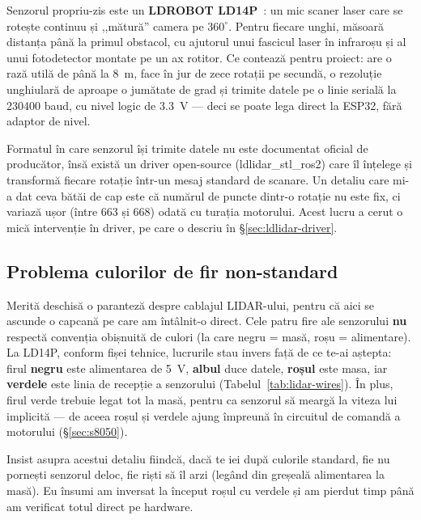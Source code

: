 \documentclass[a4paper,12pt,twoside,openany]{report}
\renewcommand{\texttt}[1]{\textnormal{#1}}
\begin{document}
Senzorul propriu-zis este un \textbf{LDROBOT LD14P}~\cite{ld14p}: un mic
scaner laser care se rotește continuu și ,,mătură'' camera pe $360^\circ$.
Pentru fiecare unghi, măsoară distanța până la primul obstacol, cu ajutorul
unui fascicul laser în infraroșu și al unui fotodetector montate pe un ax
rotitor. Ce contează pentru proiect: are o rază utilă de până la
\SI{8}{\meter}, face în jur de zece rotații pe secundă, o rezoluție unghiulară
de aproape o jumătate de grad și trimite datele pe o linie serială la
\SI{230400}{} baud, cu nivel logic de \SI{3.3}{\volt} — deci se poate lega
direct la ESP32, fără adaptor de nivel.

Formatul în care senzorul își trimite datele nu este documentat oficial de
producător, însă există un driver open-source (\texttt{ldlidar\_stl\_ros2})
care îl înțelege și transformă fiecare rotație într-un mesaj standard de
scanare. Un detaliu care mi-a dat ceva bătăi de cap este că numărul de puncte
dintr-o rotație nu este fix, ci variază ușor (între 663 și 668) odată cu
turația motorului. Acest lucru a cerut o mică intervenție în driver, pe care o
descriu în §\ref{sec:ldlidar-driver}.

\subsection{Problema culorilor de fir non-standard}
\label{sec:lidar-wires}

Merită deschisă o paranteză despre cablajul LIDAR-ului, pentru că aici se
ascunde o capcană pe care am întâlnit-o direct. Cele patru fire ale senzorului
\textbf{nu} respectă convenția obișnuită de culori (la care negru = masă, roșu
= alimentare). La LD14P, conform fișei tehnice, lucrurile stau invers față de
ce te-ai aștepta: firul \textbf{negru} este alimentarea de \SI{5}{\volt},
\textbf{albul} duce datele, \textbf{roșul} este masa, iar \textbf{verdele} este
linia de recepție a senzorului (Tabelul~\ref{tab:lidar-wires}). În plus, firul
verde trebuie legat tot la masă, pentru ca senzorul să meargă la viteza lui
implicită — de aceea roșul și verdele ajung împreună în circuitul de comandă a
motorului (§\ref{sec:s8050}).

Insist asupra acestui detaliu fiindcă, dacă te iei după culorile standard,
fie nu pornești senzorul deloc, fie riști să îl arzi (legând din greșeală
alimentarea la masă). Eu însumi am inversat la început roșul cu verdele și
am pierdut timp până am verificat totul direct pe hardware.
\end{document}
